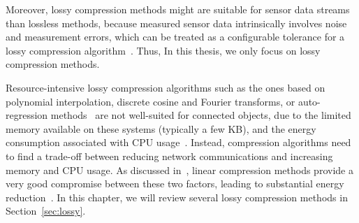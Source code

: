 Moreover, lossy compression methods might are suitable for sensor data streams
than lossless methods, because measured sensor data intrinsically involves noise
and measurement errors, which can be treated as a configurable tolerance for a
lossy compression algorithm~\cite{li2018multi}. Thus, In this thesis, we only
focus on lossy compression methods.

Resource-intensive lossy compression algorithms such as the ones based on
polynomial interpolation, discrete cosine and Fourier transforms, or
auto-regression methods~\cite{lu2010optimized} are not well-suited for connected
objects, due to the limited memory available on these systems (typically a few
KB), and the energy consumption associated with CPU usage~\cite{li2018multi}.
Instead, compression algorithms need to find a trade-off between reducing
network communications and increasing memory and CPU usage. As discussed
in~\cite{zordan2014performance}, linear compression methods provide a very good
compromise between these two factors, leading to substantial energy
reduction~\cite{li2018multi}. In this chapter, we will review several lossy
compression methods in Section~\ref{sec:lossy}.
